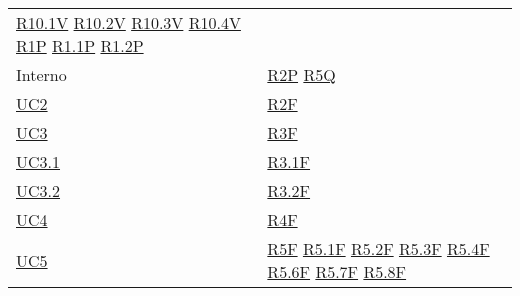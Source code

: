 \begin{center}
\begin{longtable}[!h]{m{50px} m{50px}}
        \newline \hyperref[tab:RequisitiVincolo]{R10.1V}
        \newline \hyperref[tab:RequisitiVincolo]{R10.2V}
        \newline \hyperref[tab:RequisitiVincolo]{R10.3V}
        \newline \hyperref[tab:RequisitiVincolo]{R10.4V}
        \newline \hyperref[tab:RequisitiPrestazionali]{R1P}
        \newline \hyperref[tab:RequisitiPrestazionali]{R1.1P}
        \newline \hyperref[tab:RequisitiPrestazionali]{R1.2P}                          \\

        Interno                           & \hyperref[tab:RequisitiPrestazionali]{R2P}
        \newline \hyperref[tab:RequisitiQualita]{R5Q}                                  \\

        \hyperref[sec:UC2]{UC2}           & \hyperref[tab:RequisitiFunzionali]{R2F}    \\
        \hyperref[sec:UC3]{UC3}           & \hyperref[tab:RequisitiFunzionali]{R3F}    \\
        \hyperref[sec:UC3.1]{UC3.1}       & \hyperref[tab:RequisitiFunzionali]{R3.1F}  \\
        \hyperref[sec:UC3.2]{UC3.2}       & \hyperref[tab:RequisitiFunzionali]{R3.2F}  \\
        \hyperref[sec:UC4]{UC4}           & \hyperref[tab:RequisitiFunzionali]{R4F}    \\

        \hyperref[sec:UC5]{UC5}           & \hyperref[tab:RequisitiFunzionali]{R5F}
        \newline \hyperref[tab:RequisitiFunzionali]{R5.1F}
        \newline \hyperref[tab:RequisitiFunzionali]{R5.2F}
        \newline \hyperref[tab:RequisitiFunzionali]{R5.3F}
        \newline \hyperref[tab:RequisitiFunzionali]{R5.4F}
        \newline \hyperref[tab:RequisitiFunzionali]{R5.6F}
        \newline \hyperref[tab:RequisitiFunzionali]{R5.7F}                             
        \newline \hyperref[tab:RequisitiFunzionali]{R5.8F}                             \\


\end{longtable}
\end{center}
